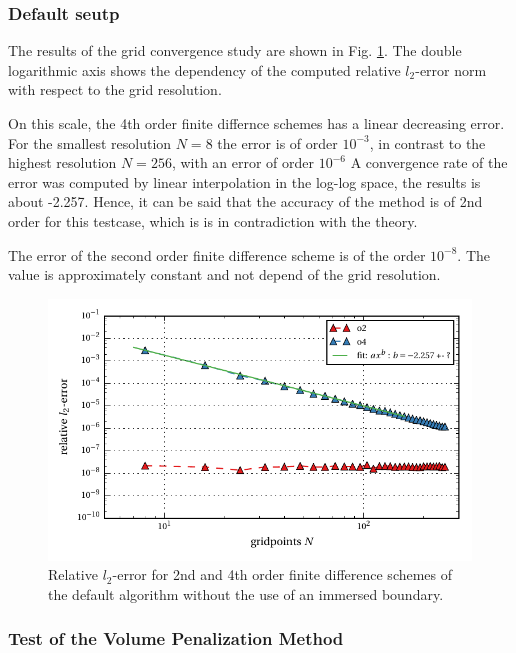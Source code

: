 \subsubsection{Default seutp}

The results of the grid convergence study are shown in Fig. \ref{fig:ema1}.
The double logarithmic axis shows the dependency of the computed relative $l_2$-error norm
with respect to the grid resolution.

On this scale, the 4th order finite differnce schemes has a linear decreasing error.
For the smallest resolution $N=8$ the error is of order $10^{-3}$,
in contrast to the highest resolution $N=256$, with an error of order $10^{-6}$
A convergence rate of the error  was computed by linear interpolation in the log-log space,
the results is about -2.257.
Hence, it can be said that the accuracy of the method is of 2nd order for this testcase,
which is is in contradiction with the theory.

The error of the second order finite difference scheme is of the order $10^{-8}$.
The value is approximately constant and not depend of the grid resolution.


\begin{figure}[!bp]
    \centering
    \includegraphics{gfx/immersed_boundary/poiseuille_flow/1_default/relative_l2error.pdf}
    \caption{Relative $l_2$-error for 2nd and 4th order finite difference schemes of the default algorithm without the use of an immersed boundary.\label{fig:ema1}}
\end{figure}

\clearpage


\subsubsection{Test of the Volume Penalization Method}

